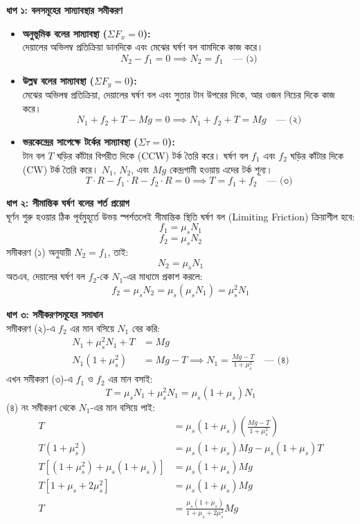 \documentclass[12pt, a4paper]{article}
\begin{document}
\begin{tcolorbox}[solutionbox={সমাধান (Solution)}]
\noindent
\textbf{ধাপ ১: বলসমূহের সাম্যাবস্থার সমীকরণ} \\
\begin{itemize}[leftmargin=*, parsep=0.5ex]
    \item \textbf{অনুভূমিক বলের সাম্যাবস্থা ($\Sigma F_x = 0$):} \\
    দেয়ালের অভিলম্ব প্রতিক্রিয়া ডানদিকে এবং মেঝের ঘর্ষণ বল বামদিকে কাজ করে। 
    \[ N_2 - f_1 = 0 \implies N_2 = f_1 \quad \text{--- (১)} \]
    
    \item \textbf{উল্লম্ব বলের সাম্যাবস্থা ($\Sigma F_y = 0$):} \\
    মেঝের অভিলম্ব প্রতিক্রিয়া, দেয়ালের ঘর্ষণ বল এবং সুতার টান উপরের দিকে, আর ওজন নিচের দিকে কাজ করে।
    \[ N_1 + f_2 + T - Mg = 0 \implies N_1 + f_2 + T = Mg \quad \text{--- (২)} \]
    
    \item \textbf{ভরকেন্দ্রের সাপেক্ষে টর্কের সাম্যাবস্থা ($\Sigma \tau = 0$):} \\
    টান বল $T$ ঘড়ির কাঁটার বিপরীত দিকে (CCW) টর্ক তৈরি করে। ঘর্ষণ বল $f_1$ এবং $f_2$ ঘড়ির কাঁটার দিকে (CW) টর্ক তৈরি করে। $N_1$, $N_2$, এবং $Mg$ কেন্দ্রগামী হওয়ায় এদের টর্ক শূন্য।
    \[ T \cdot R - f_1 \cdot R - f_2 \cdot R = 0 \implies T = f_1 + f_2 \quad \text{--- (৩)} \]
\end{itemize}

\vspace{0.5em}
\noindent
\textbf{ধাপ ২: সীমান্তিক ঘর্ষণ বলের শর্ত প্রয়োগ} \\
ঘূর্ণন শুরু হওয়ার ঠিক পূর্বমুহূর্তে উভয় স্পর্শতলেই সীমান্তিক স্থিতি ঘর্ষণ বল (Limiting Friction) ক্রিয়াশীল হবে:
\[ f_1 = \mu_s N_1 \]
\[ f_2 = \mu_s N_2 \]
সমীকরণ (১) অনুযায়ী $N_2 = f_1$, তাই:
\[ N_2 = \mu_s N_1 \]
অতএব, দেয়ালের ঘর্ষণ বল $f_2$-কে $N_1$-এর মাধ্যমে প্রকাশ করলে:
\[ f_2 = \mu_s N_2 = \mu_s (\mu_s N_1) = \mu_s^2 N_1 \]

\vspace{0.5em}
\noindent
\textbf{ধাপ ৩: সমীকরণসমূহের সমাধান} \\
সমীকরণ (২)-এ $f_2$ এর মান বসিয়ে $N_1$ বের করি:
\begin{align*}
    N_1 + \mu_s^2 N_1 + T &= Mg \\
    N_1(1 + \mu_s^2) &= Mg - T \implies N_1 = \frac{Mg - T}{1 + \mu_s^2} \quad \text{--- (৪)}
\end{align*}
এখন সমীকরণ (৩)-এ $f_1$ ও $f_2$ এর মান বসাই:
\[ T = \mu_s N_1 + \mu_s^2 N_1 = \mu_s(1 + \mu_s) N_1 \]
(৪) নং সমীকরণ থেকে $N_1$-এর মান বসিয়ে পাই:
\begin{align*}
    T &= \mu_s(1 + \mu_s) \left( \frac{Mg - T}{1 + \mu_s^2} \right) \\
    T(1 + \mu_s^2) &= \mu_s(1 + \mu_s)Mg - \mu_s(1 + \mu_s)T \\
    T \left[ (1 + \mu_s^2) + \mu_s(1 + \mu_s) \right] &= \mu_s(1 + \mu_s)Mg \\
    T \left[ 1 + \mu_s + 2\mu_s^2 \right] &= \mu_s(1 + \mu_s)Mg \\
    T &= \frac{\mu_s(1 + \mu_s)}{1 + \mu_s + 2\mu_s^2} Mg
\end{align*}


\end{tcolorbox}
\end{document}
